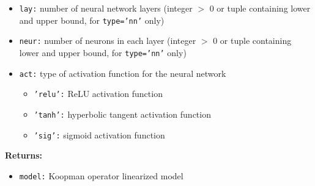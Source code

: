 \documentclass{article}
\begin{document}
\begin{itemize}
	\item \texttt{lay:} number of neural network layers (integer $>$ 0 or tuple containing lower and upper bound, for \texttt{type='nn'} only)
	\item \texttt{neur:} number of neurons in each layer (integer $>$ 0 or tuple containing lower and upper bound, for \texttt{type='nn'} only)
	\item \texttt{act:} type of activation function for the neural network
		\begin{itemize}
			\item \texttt{'relu':} ReLU activation function
			\item \texttt{'tanh':} hyperbolic tangent activation function
			\item \texttt{'sig':} sigmoid activation function
		\end{itemize}
\end{itemize}

\noindent \textbf{Returns:}

\begin{itemize}
	\item \texttt{model:} Koopman operator linearized model
\end{itemize}
\end{document}
